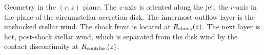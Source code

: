 \label{fig:sketch}
Geometry in the $(r,z)$ plane. The $z$-axis is oriented along the jet, the $r$-axis in the plane of the circumstellar accretion disk. The innermost outflow layer is the unshocked stellar wind. The shock front is located at $R_{\rm{shock}}(z)$. The next layer is hot, post-shock stellar wind, which is separated from the disk wind by the contact discontinuity at $R_{\rm{contdisc}}(z)$.
